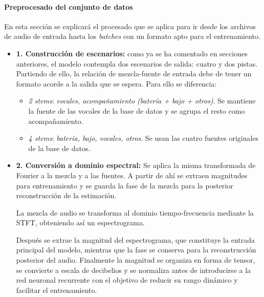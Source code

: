 \paragraph{Preprocesado del conjunto de datos}

En esta sección se explicará el procesado que se aplica para ir desde los archivos de audio de entrada hasta los \textit{batches} con un formato apto para el entrenamiento.

\begin{itemize}

    \item \textbf{1. Construcción de escenarios:}
    como ya se ha comentado en secciones anteriores, el modelo contempla dos escenarios de salida: cuatro y dos pistas. Partiendo de ello, la relación de mezcla-fuente de entrada debe de tener un formato acorde a la salida que se espera. Para ello se diferencia:

    \begin{itemize}
        \item \textit{2 stems}: \textit{vocales, acompañamiento (batería + bajo + otros)}. Se mantiene la fuente de las vocales de la base de datos y se agrupa el resto como acompañamiento.
        \item \textit{4 stems}: \textit{batería, bajo, vocales, otros}. Se usan las cuatro fuentes originales de la base de datos.
    \end{itemize}

    \item \textbf{2. Conversión a dominio espectral:}
    Se aplica la misma transformada de Fourier a la mezcla y a las fuentes. A partir de ahí se extraen magnitudes para entrenamiento y se guarda la fase de la mezcla para la posterior reconstrucción de la estimación.
    
    La mezcla de audio se transforma al dominio tiempo-frecuencia mediante la STFT, obteniendo así un espectrograma. 
    
    Después se extrae la magnitud del espectrograma, que constituye la entrada principal del modelo, mientras que la fase se conserva para la reconstrucción posterior del audio. Finalmente la magnitud se organiza en forma de tensor, se convierte a escala de decibelios y se normaliza antes de introducirse a la red neuronal recurrente con el objetivo de reducir su rango dinámico y facilitar el entrenamiento.


\end{itemize}
